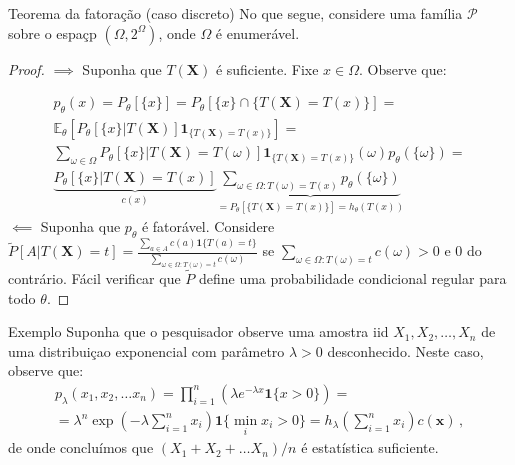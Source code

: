 \documentclass[11pt]{beamer}
\begin{document}
	\begin{frame}{Teorema da fatoração (caso discreto)}
		No que segue, considere uma família $\mathcal{P}$ sobre o espaçp $(\Omega, 2^\Omega)$, onde $\Omega$ é enumerável.
		\begin{proof}
			\footnotesize
			$\implies$ Suponha que $T(\boldsymbol{X})$ é suficiente. Fixe $x \in \Omega$. Observe que:
			
			\begin{align*}
			p_{\theta}(x) = P_\theta[\{ x\}] =  P_\theta[\{x\} \cap \{T(\boldsymbol{X})= T(x)\}] =\\
			  \mathbb{E}_\theta[P_\theta[\{x\}|T(\boldsymbol{X})] \mathbf{1}_{\{T(\boldsymbol{X}) = T(x)\}}] =\\ \sum_{\omega \in \Omega}  P_\theta[\{x\}|T(\boldsymbol{X}) = T(\omega)] \mathbf{1}_{\{T(\boldsymbol{X}) = T(x)\}}(\omega) p_\theta(\{\omega\}) = \\
			  	 \underbrace{P_\theta[\{x\}|T(\boldsymbol{X})=T(x)]}_{c(x)} \underbrace{\sum_{\omega \in \Omega: T(\omega)= T(x)} p_\theta(\{\omega\})}_{=P_\theta[\{T(\boldsymbol{X}) = T(x)\}] = h_{\theta}(T(x))}
			\end{align*}
			$\impliedby$ Suponha que $p_\theta$ é fatorável. Considere $\tilde{P}[A|T(\boldsymbol{X}) = t] = \frac{\sum_{a\in A}c(a) \mathbf{1}\{T(a) = t\}}{\sum_{\omega \in \Omega : T(\omega) = t} c(\omega)}$ se $\sum_{\omega \in \Omega : T(\omega) = t} c(\omega)>0$ e $0$ do contrário. Fácil verificar que $\tilde{P}$ define uma probabilidade condicional regular para todo $\theta$.
		\end{proof}
		
		
		

\end{frame}
	
	\begin{frame}{Exemplo}
		Suponha que o pesquisador observe uma amostra iid $X_1,X_2, \ldots, X_n$ de uma distribuiçao exponencial com parâmetro $\lambda > 0$ desconhecido.  Neste caso, observe que:
		\begin{equation*}
			\begin{aligned}
				p_\lambda(x_1,x_2,\ldots x_n) = \prod_{i=1}^n (\lambda e^{-\lambda x} \mathbf{1}\{x>0\}) =\\ =  \lambda^n \exp\left(- \lambda \sum_{i=1}^n x_i\right)\mathbf{1}\{\min_i x_i > 0 \} = h_\lambda \left(\sum_{i=1}^n x_i\right) c(\boldsymbol{x}) \, ,
			\end{aligned}
		\end{equation*}
		de onde concluímos que $(X_1+X_2 + \ldots X_n)/n$ é estatística suficiente.
		
	\end{frame}
	
\end{document}
